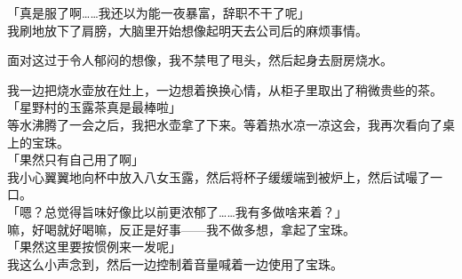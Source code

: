 「真是服了啊……我还以为能一夜暴富，辞职不干了呢」\\

我刷地放下了肩膀，大脑里开始想像起明天去公司后的麻烦事情。

面对这过于令人郁闷的想像，我不禁甩了甩头，然后起身去厨房烧水。

我一边把烧水壶放在灶上，一边想着换换心情，从柜子里取出了稍微贵些的茶。\\

「星野村的玉露茶真是最棒啦」\\

等水沸腾了一会之后，我把水壶拿了下来。等着热水凉一凉这会，我再次看向了桌上的宝珠。\\

「果然只有自己用了啊」\\

我小心翼翼地向杯中放入八女玉露，然后将杯子缓缓端到被炉上，然后试嘬了一口。\\

「嗯？总觉得旨味好像比以前更浓郁了……我有多做啥来着？」\\

嘛，好喝就好喝嘛，反正是好事——我不做多想，拿起了宝珠。\\

「果然这里要按惯例来一发呢」\\

我这么小声念到，然后一边控制着音量喊着一边使用了宝珠。\\

